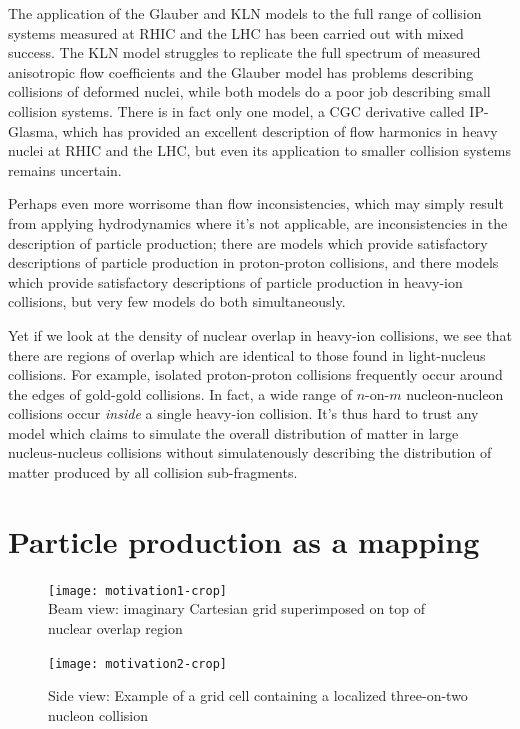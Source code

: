 \documentclass[aps,prc,reprint,amsmath,nofootinbib]{revtex4-1}
\begin{document}
The application of the Glauber and KLN models to the full range of collision systems measured at RHIC and the LHC has been carried out with mixed success. The KLN model
struggles to replicate the full spectrum of measured anisotropic flow coefficients and the Glauber model has problems describing collisions of deformed nuclei, while 
both models do a poor job describing small collision systems. There is in fact only one model, a CGC derivative called IP-Glasma, which has provided an excellent 
description of flow harmonics in heavy nuclei at RHIC and the LHC, but even its application to smaller collision systems remains uncertain.

Perhaps even more worrisome than flow inconsistencies, which may simply result from applying hydrodynamics where it's not applicable, are inconsistencies in the description 
of particle production; there are models which provide satisfactory descriptions of particle production in proton-proton collisions, and there models which provide 
satisfactory descriptions of particle production in heavy-ion collisions, but very few models do both simultaneously. 

Yet if we look at the density of nuclear overlap in heavy-ion collisions, we see that there are regions of overlap which are identical to those found in light-nucleus 
collisions. For example, isolated proton-proton collisions frequently occur around the edges of gold-gold collisions. In fact, a wide range of $n$-on-$m$ nucleon-nucleon 
collisions occur \emph{inside} a single heavy-ion collision. It's thus hard to trust any model which claims to simulate the overall distribution of matter in large nucleus-nucleus collisions without simulatenously describing the 
distribution of matter produced by all collision sub-fragments. 

\section{Particle production as a mapping}

\begin{figure}
 \texttt{[image: motivation1-crop]}\\
 \caption{\label{fig:motivation_beam} Beam view: imaginary Cartesian grid superimposed on top of nuclear overlap region}
 \texttt{[image: motivation2-crop]}
 \caption{\label{fig:motivation_side} Side view: Example of a grid cell containing a localized three-on-two nucleon collision}
\end{figure}
\end{document}
